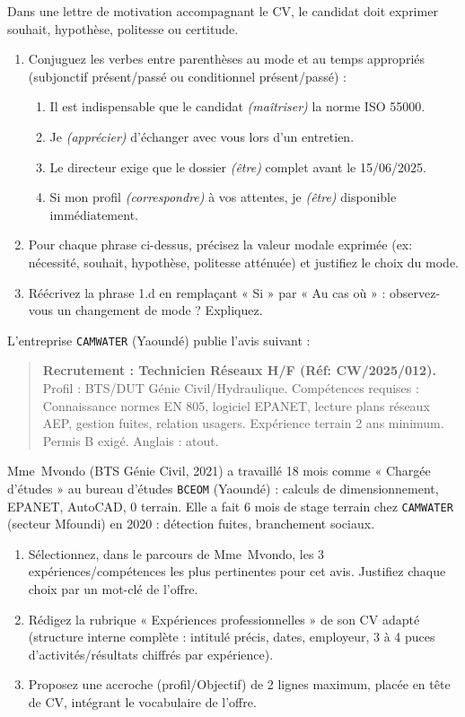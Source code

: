 \documentclass[11pt]{article}
\begin{document}
\begin{exercice}
Dans une lettre de motivation accompagnant le CV, le candidat doit exprimer souhait, hypothèse, politesse ou certitude. 
\begin{enumerate}
    \item Conjuguez les verbes entre parenthèses au mode et au temps appropriés (subjonctif présent/passé ou conditionnel présent/passé) :
    \begin{enumerate}
        \item Il est indispensable que le candidat \textit{(maîtriser)} la norme ISO 55000.
        \item Je \textit{(apprécier)} d'échanger avec vous lors d'un entretien.
        \item Le directeur exige que le dossier \textit{(être)} complet avant le 15/06/2025.
        \item Si mon profil \textit{(correspondre)} à vos attentes, je \textit{(être)} disponible immédiatement.
    \end{enumerate}
    \item Pour chaque phrase ci-dessus, précisez la valeur modale exprimée (ex: nécessité, souhait, hypothèse, politesse atténuée) et justifiez le choix du mode.
    \item Réécrivez la phrase 1.d en remplaçant « Si » par « Au cas où » : observez-vous un changement de mode ? Expliquez.
\end{enumerate}
\end{exercice}

\begin{exercice}
L'entreprise \texttt{CAMWATER} (Yaoundé) publie l'avis suivant : 
\begin{quote}
\textbf{Recrutement : Technicien Réseaux H/F (Réf: CW/2025/012).} 
Profil : BTS/DUT Génie Civil/Hydraulique. 
Compétences requises : Connaissance normes EN 805, logiciel EPANET, lecture plans réseaux AEP, gestion fuites, relation usagers. 
Expérience terrain 2 ans minimum. Permis B exigé. Anglais : atout.
\end{quote}
Mme~Mvondo (BTS Génie Civil, 2021) a travaillé 18 mois comme « Chargée d'études » au bureau d'études \texttt{BCEOM} (Yaoundé) : calculs de dimensionnement, EPANET, AutoCAD, 0 terrain. Elle a fait 6 mois de stage terrain chez \texttt{CAMWATER} (secteur Mfoundi) en 2020 : détection fuites, branchement sociaux.
\begin{enumerate}
    \item Sélectionnez, dans le parcours de Mme~Mvondo, les 3 expériences/compétences les plus pertinentes pour cet avis. Justifiez chaque choix par un mot-clé de l'offre.
    \item Rédigez la rubrique « Expériences professionnelles » de son CV adapté (structure interne complète : intitulé précis, dates, employeur, 3 à 4 puces d'activités/résultats chiffrés par expérience).
    \item Proposez une accroche (profil/Objectif) de 2 lignes maximum, placée en tête de CV, intégrant le vocabulaire de l'offre.
\end{enumerate}
\end{exercice}
\end{document}
